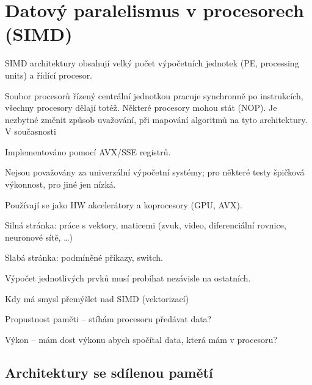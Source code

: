 \section{Datový paralelismus v procesorech (SIMD)}

\begin{compactitem}
    \item SIMD architektury obsahují velký počet výpočetních jednotek (PE, processing units) a řídící procesor. \begin{compactitem}
        \item Soubor procesorů řízený centrální jednotkou pracuje synchronně po instrukcích, všechny procesory dělají totéž. Některé procesory mohou stát (NOP). Je nezbytné změnit způsob uvažování, při mapování algoritmů na tyto architektury. V současnosti
        \item Implementováno pomocí AVX/SSE registrů.
    \end{compactitem}

    \item Nejsou považovány za univerzální výpočetní systémy; pro
    některé testy špičková výkonnost, pro jiné jen nízká. \begin{compactitem}
        \item Používají se jako HW akcelerátory a koprocesory (GPU, AVX).
        \item Silná stránka: práce s vektory, maticemi (zvuk, video, diferenciální rovnice, neuronové sítě, \ldots)
        \item Slabá stránka: podmíněné příkazy, switch.
    \end{compactitem}

    \item Výpočet jednotlivých prvků musí probíhat nezávisle na
    ostatních.

    \item Kdy má smysl přemýšlet nad SIMD (vektorizací) \begin{compactitem}
        \item Propustnost paměti -- stíhám procesoru předávat data?
        \item Výkon -- mám dost výkonu abych spočítal data, která mám v procesoru?
    \end{compactitem}
\end{compactitem}

\subsection{Architektury se sdílenou pamětí}

